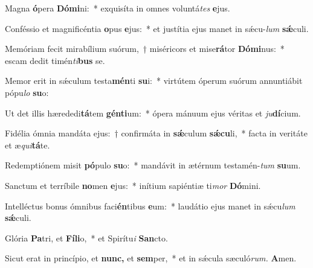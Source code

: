 \item Magna \textbf{ó}pera \textbf{Dó}\textbf{mi}ni:~* exquisíta in omnes voluntá\hspace{0.03em}\textit{tes} \textbf{e}jus.
\item Conféssio et magnificéntia \textbf{o}pus \textbf{e}jus:~* et justítia ejus manet in sǽcu-\textit{lum} \textbf{sǽ}culi.
\item Memóriam fecit mirabílium suórum,~† miséricors et mise\textbf{rá}tor \textbf{Dó}\textbf{mi}nus:~* escam dedit timén\hspace{0.03em}\textit{ti}\textbf{bus} se.
\item Memor erit in sǽculum testa\textbf{mén}ti \textbf{su}i:~* virtútem óperum suórum annuntiábit pópu\hspace{0.03em}\textit{lo} \textbf{su}o:
\item Ut det illis hærededi\textbf{tá}tem \textbf{gén}\textbf{ti}um:~* ópera mánuum ejus véritas et \textit{ju}\textbf{dí}cium.
\item Fidélia ómnia mandáta ejus:~† confirmáta in \textbf{sǽ}culum \textbf{sǽ}\textbf{cu}li,~* facta in veritáte et æ\hspace{0.03em}\textit{qui}\textbf{tá}te.
\item Redemptiónem misit \textbf{pó}pulo \textbf{su}o:~* mandávit in ætérnum testamén-\textit{tum} \textbf{su}um.
\item Sanctum et terríbile \textbf{no}men \textbf{e}jus:~* inítium sapiéntiæ ti\hspace{0.03em}\textit{mor} \textbf{Dó}mini.
\item Intelléctus bonus ómnibus faci\textbf{én}tibus \textbf{e}um:~* laudátio ejus manet in sǽcu\hspace{0.03em}\textit{lum} \textbf{sǽ}culi.
\item Glória \textbf{Pa}tri, et \textbf{Fí}\textbf{li}o,~* et Spirítu\hspace{0.03em}\textit{i} \textbf{San}cto.
\item Sicut erat in princípio, et \textbf{nunc,} et \textbf{sem}per,~* et in sǽcula sæculó\textit{rum.} \textbf{A}men.
